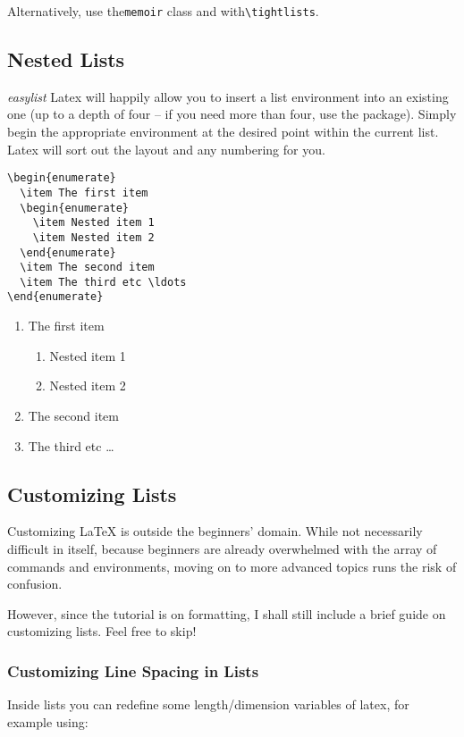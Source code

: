 Alternatively, use the\texttt{memoir} class and with\verb|\tightlists|.

\subsection{Nested Lists}
 \textit{easylist} Latex will happily allow you to insert a list environment
into an existing one (up to a depth of four -- if you need more than four, use
the  package). Simply begin the appropriate environment at the desired point
within the current list. Latex will sort out the layout and any numbering for
you.

\begin{lstlisting}
\begin{enumerate}
  \item The first item
  \begin{enumerate}
    \item Nested item 1
    \item Nested item 2
  \end{enumerate}
  \item The second item
  \item The third etc \ldots
\end{enumerate}
\end{lstlisting}
\begin{enumerate}
  \item The first item
  \begin{enumerate}
    \item Nested item 1
    \item Nested item 2
  \end{enumerate}
  \item The second item
  \item The third etc \ldots
\end{enumerate}

\subsection{Customizing Lists}
Customizing LaTeX is outside the beginners' domain. While not necessarily
difficult in itself, because beginners are already overwhelmed with the array
of commands and environments, moving on to more advanced topics runs the risk
of confusion.

However, since the tutorial is on formatting, I shall still include a brief
guide on customizing lists. Feel free to skip!

\subsubsection{Customizing Line Spacing in Lists}
Inside lists you can redefine some length/dimension variables of latex, for
example using:

